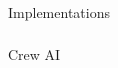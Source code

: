 \begin{frame}[fragile]\frametitle{}
\begin{center}
{\Large Implementations}
\end{center}
\end{frame}

\begin{frame}[fragile]\frametitle{}
\begin{center}
{\Large Crew AI}
\end{center}
\end{frame}
